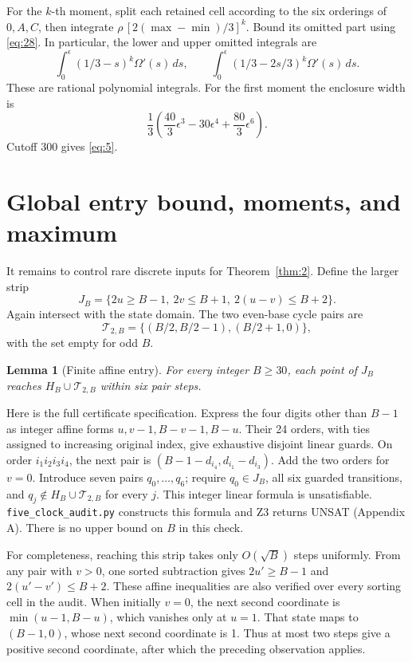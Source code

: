 \documentclass[11pt]{amsart}
\newtheorem{lemma}[theorem]{Lemma}
\begin{document}
For the \(k\)-th moment, split each retained cell according to the six orderings of \(0,A,C\), then integrate \(\rho\,[2(\max-\min)/3]^k\). Bound its omitted part using \eqref{eq:28}. In particular, the lower and upper omitted integrals are \begin{equation}\label{eq:29}
\int_0^\epsilon(1/3-s)^k \Omega'(s)\,ds,
 \qquad \int_0^\epsilon(1/3-2s/3)^k \Omega'(s)\,ds.
\end{equation} These are rational polynomial integrals. For the first moment the enclosure width is \[\frac13\left(\frac{40}3\epsilon^3-30\epsilon^4
                         +\frac{80}3\epsilon^6\right).\] Cutoff 300 gives \eqref{eq:5}.

\section{Global entry bound, moments, and maximum}

It remains to control rare discrete inputs for Theorem~\ref{thm:2}. Define the larger strip \begin{equation}\label{eq:30}
J_B=\{2u\ge B-1,\ 2v\le B+1,\ 2(u-v)\le B+2\}.
\end{equation} Again intersect with the state domain. The two even-base cycle pairs are \[\mathcal T_{2,B}=\{(B/2,B/2-1),(B/2+1,0)\},\] with the set empty for odd \(B\).

\begin{lemma}[Finite affine entry]\label{lem:entry}
For every integer \(B\ge30\), each point of \(J_B\) reaches \(H_B\cup\mathcal T_{2,B}\) within six pair steps.
\end{lemma}

Here is the full certificate specification. Express the four digits other than \(B-1\) as integer affine forms \(u,v-1,B-v-1,B-u\). Their 24 orders, with ties assigned to increasing original index, give exhaustive disjoint linear guards. On order \(i_1i_2i_3i_4\), the next pair is \((B-1-d_{i_4},d_{i_1}-d_{i_3})\). Add the two orders for \(v=0\). Introduce seven pairs \(q_0,\ldots,q_6\); require \(q_0\in J_B\), all six guarded transitions, and \(q_j\notin H_B\cup\mathcal T_{2,B}\) for every \(j\). This integer linear formula is unsatisfiable. \texttt{five\_clock\_audit.py} constructs this formula and Z3 returns UNSAT (Appendix A). There is no upper bound on \(B\) in this check.

For completeness, reaching this strip takes only \(O(\sqrt B)\) steps uniformly. From any pair with \(v>0\), one sorted subtraction gives \(2u'\ge B-1\) and \(2(u'-v')\le B+2\). These affine inequalities are also verified over every sorting cell in the audit. When initially \(v=0\), the next second coordinate is \(\min(u-1,B-u)\), which vanishes only at \(u=1\). That state maps to \((B-1,0)\), whose next second coordinate is 1. Thus at most two steps give a positive second coordinate, after which the preceding observation applies.
\end{document}
